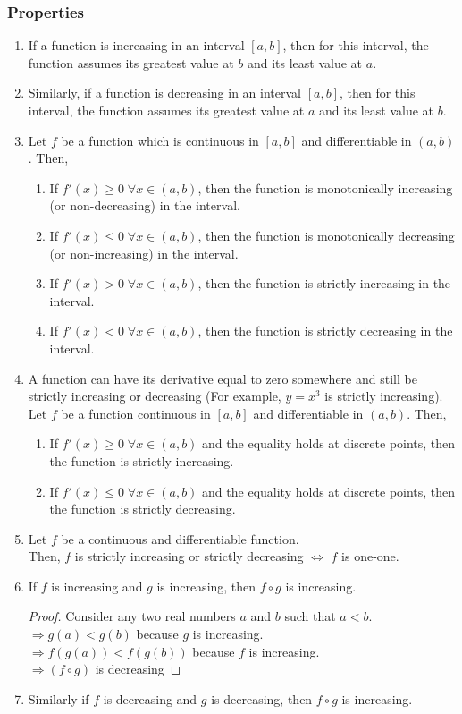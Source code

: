 \documentclass[14]{article}
\theoremstyle{definition}
\begin{document}
\subsubsection{Properties}
\begin{enumerate}
\item If a function is increasing in an interval $[a, b]$, then for this interval, the function assumes its greatest value at $b$ and its least value at $a$.
\item Similarly, if a function is decreasing in an interval $[a, b]$, then for this interval, the function assumes its greatest value at $a$ and its least value at $b$.
\item Let $f$ be a function which is continuous in $[a, b]$ and differentiable in $(a, b)$. Then,
\begin{enumerate}
\item If $f'(x) \geq 0 \; \forall x \in (a, b)$, then the function is monotonically increasing (or non-decreasing) in the interval.
\item If $f'(x) \leq 0 \; \forall x \in (a, b)$, then the function is monotonically decreasing (or non-increasing) in the interval.
\item If $f'(x) > 0 \; \forall x \in (a, b)$, then the function is strictly increasing in the interval.
\item If $f'(x) < 0 \; \forall x \in (a, b)$, then the function is strictly decreasing in the interval.
\end{enumerate}
\item A function can have its derivative equal to zero somewhere and still be strictly increasing or decreasing (For example, $y=x^3$ is strictly increasing). Let $f$ be a function continuous in $[a, b]$ and differentiable in $(a, b)$. Then,
\begin{enumerate}
\item If $f'(x) \geq 0 \; \forall x \in (a, b)$ and the equality holds at discrete points, then the function is strictly increasing.
\item If $f'(x) \leq 0 \; \forall x \in (a, b)$ and the equality holds at discrete points, then the function is strictly decreasing.
\end{enumerate}
\item Let $f$ be a continuous and differentiable function.\\ Then, $f$ is strictly increasing or strictly decreasing $\Leftrightarrow$ $f$ is one-one.
\pagebreak
\item If $f$ is increasing and $g$ is increasing, then $f\circ g$ is increasing.
\begin{proof}
Consider any two real numbers $a$ and $b$ such that $a < b$.\\
$\Rightarrow g(a) < g(b)$ because $g$ is increasing.\\
$\Rightarrow f(g(a)) < f(g(b))$ because $f$ is increasing.\\
$\Rightarrow (f \circ g)$ is decreasing
\end{proof}
\item Similarly if $f$ is decreasing and $g$ is decreasing, then $f \circ g$ is increasing.
\end{enumerate}
\end{document}
